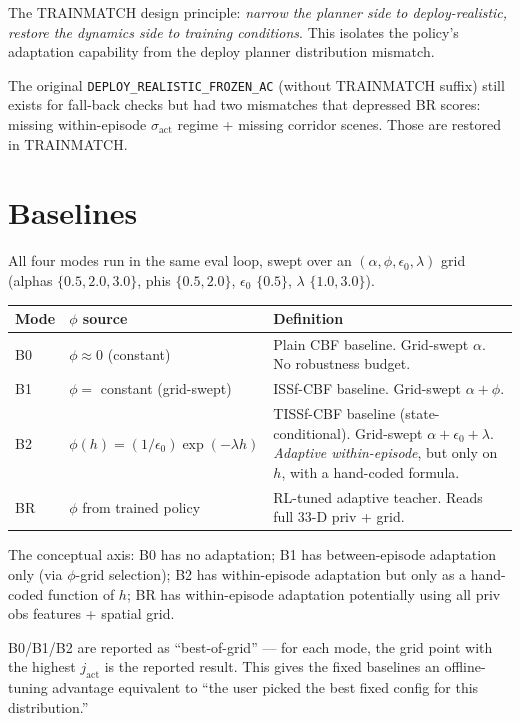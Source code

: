 \documentclass[11pt]{article}
\begin{document}
The TRAINMATCH design principle: \emph{narrow the planner side to deploy-realistic, restore the dynamics side to training conditions}. This isolates the policy's adaptation capability from the deploy planner distribution mismatch.

The original \texttt{DEPLOY\_REALISTIC\_FROZEN\_AC} (without TRAINMATCH suffix) still exists for fall-back checks but had two mismatches that depressed BR scores: missing within-episode $\sigma_\text{act}$ regime + missing corridor scenes. Those are restored in TRAINMATCH.

\section*{Baselines}

All four modes run in the same eval loop, swept over an $(\alpha, \phi, \epsilon_0, \lambda)$ grid (alphas $\{0.5, 2.0, 3.0\}$, phis $\{0.5, 2.0\}$, $\epsilon_0$ $\{0.5\}$, $\lambda$ $\{1.0, 3.0\}$).

\begin{center}
\begin{tabular}{@{}l p{1.5in} p{2.8in}@{}}
\toprule
Mode & $\phi$ source & Definition \\
\midrule
B0 & $\phi \approx 0$ (constant)           & Plain CBF baseline. Grid-swept $\alpha$. No robustness budget. \\
B1 & $\phi = $ constant (grid-swept)        & ISSf-CBF baseline. Grid-swept $\alpha + \phi$. \\
B2 & $\phi(h) = (1/\epsilon_0) \exp(-\lambda h)$ & TISSf-CBF baseline (state-conditional). Grid-swept $\alpha + \epsilon_0 + \lambda$. \emph{Adaptive within-episode}, but only on $h$, with a hand-coded formula. \\
BR & $\phi$ from trained policy             & RL-tuned adaptive teacher. Reads full $33$-D priv + grid. \\
\bottomrule
\end{tabular}
\end{center}

The conceptual axis: B0 has no adaptation; B1 has between-episode adaptation only (via $\phi$-grid selection); B2 has within-episode adaptation but only as a hand-coded function of $h$; BR has within-episode adaptation potentially using all priv obs features + spatial grid.

B0/B1/B2 are reported as ``best-of-grid'' — for each mode, the grid point with the highest $j_\text{act}$ is the reported result. This gives the fixed baselines an offline-tuning advantage equivalent to ``the user picked the best fixed config for this distribution.''
\end{document}

